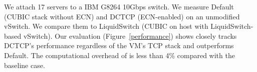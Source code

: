 We attach 17 servers to a IBM G8264 10Gbps switch. We measure Default (CUBIC stack without ECN) and DCTCP (ECN-enabled) on an unmodified vSwitch. We compare them to LiquidSwitch (CUBIC on host with LiquidSwitch-based vSwitch).
Our evaluation (Figure~\ref{performance}) shows \acdc{} closely tracks DCTCP's performance regardless of the VM's TCP stack and outperforms Default.
The computational overhead of \acdc{} is less than 4\% compared with the baseline case.
